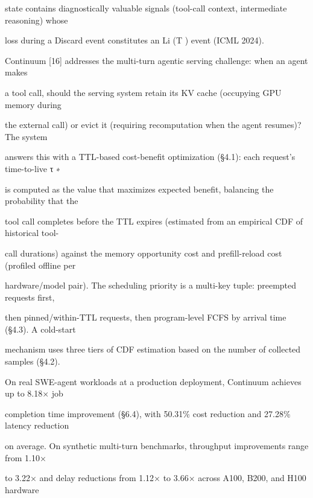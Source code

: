 \begin{flushleft}
\noindent state contains diagnostically valuable signals (tool-call context, intermediate reasoning) whose\par
\noindent loss during a Discard event constitutes an Li (T ) event (ICML 2024).\par
\noindent  Continuum [16] addresses the multi-turn agentic serving challenge: when an agent makes\par
\noindent a tool call, should the serving system retain its KV cache (occupying GPU memory during\par
\noindent the external call) or evict it (requiring recomputation when the agent resumes)? The system\par
\noindent answers this with a TTL-based cost-benefit optimization (§4.1): each request’s time-to-live τ ∗\par
\noindent is computed as the value that maximizes expected benefit, balancing the probability that the\par
\noindent tool call completes before the TTL expires (estimated from an empirical CDF of historical tool-\par
\noindent call durations) against the memory opportunity cost and prefill-reload cost (profiled offline per\par
\noindent hardware/model pair). The scheduling priority is a multi-key tuple: preempted requests first,\par
\noindent then pinned/within-TTL requests, then program-level FCFS by arrival time (§4.3). A cold-start\par
\noindent mechanism uses three tiers of CDF estimation based on the number of collected samples (§4.2).\par
\noindent On real SWE-agent workloads at a production deployment, Continuum achieves up to 8.18× job\par
\noindent completion time improvement (§6.4), with 50.31\% cost reduction and 27.28\% latency reduction\par
\noindent on average. On synthetic multi-turn benchmarks, throughput improvements range from 1.10×\par
\noindent to 3.22× and delay reductions from 1.12× to 3.66× across A100, B200, and H100 hardware\par
\end{flushleft}
